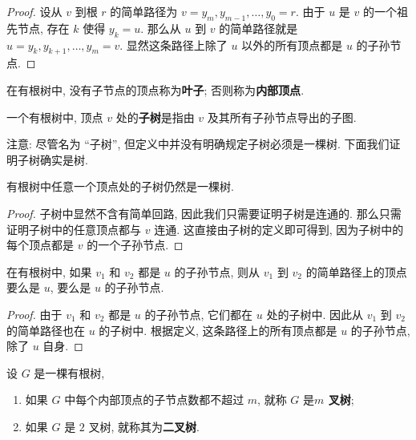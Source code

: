 \begin{proof}
    设从 $v$ 到根 $r$ 的简单路径为 $v=y_m, y_{m-1}, \dots, y_0=r$. 由于 $u$ 是 $v$ 的一个祖先节点, 存在 $k$ 使得 $y_k=u$. 那么从 $u$ 到 $v$ 的简单路径就是 $u=y_k, y_{k+1}, \dots, y_m=v$. 显然这条路径上除了 $u$ 以外的所有顶点都是 $u$ 的子孙节点.
\end{proof}

\begin{definition}[叶子和内部顶点]
    在有根树中, 没有子节点的顶点称为\textbf{叶子}; 否则称为\textbf{内部顶点}.
\end{definition}

\begin{definition}[子树]
    一个有根树中, 顶点 $v$ 处的\textbf{子树}是指由 $v$ 及其所有子孙节点导出的子图.
\end{definition}

注意: 尽管名为 ``子树'', 但定义中并没有明确规定子树必须是一棵树. 下面我们证明子树确实是树.

\begin{theorem}
    有根树中任意一个顶点处的子树仍然是一棵树.
\end{theorem}

\begin{proof}
    子树中显然不含有简单回路, 因此我们只需要证明子树是连通的. 那么只需证明子树中的任意顶点都与 $v$ 连通. 这直接由子树的定义即可得到, 因为子树中的每个顶点都是 $v$ 的一个子孙节点.
\end{proof}

\begin{theorem}
    在有根树中, 如果 $v_1$ 和 $v_2$ 都是 $u$ 的子孙节点, 则从 $v_1$ 到 $v_2$ 的简单路径上的顶点要么是 $u$, 要么是 $u$ 的子孙节点.
\end{theorem}

\begin{proof}
    由于 $v_1$ 和 $v_2$ 都是 $u$ 的子孙节点, 它们都在 $u$ 处的子树中. 因此从 $v_1$ 到 $v_2$ 的简单路径也在 $u$ 的子树中. 根据定义, 这条路径上的所有顶点都是 $u$ 的子孙节点, 除了 $u$ 自身.
\end{proof}

\begin{definition}[$m$ 叉树]
    设 $G$ 是一棵有根树,
    \begin{enumerate}[itemindent=0ex, itemsep=0pt, label=\upshape{(\alph*)}]
        \item 如果 $G$ 中每个内部顶点的子节点数都不超过 $m$, 就称 $G$ 是\textbf{$m$ 叉树};
        \item 如果 $G$ 是 $2$ 叉树, 就称其为\textbf{二叉树}.
    \end{enumerate}
\end{definition}


